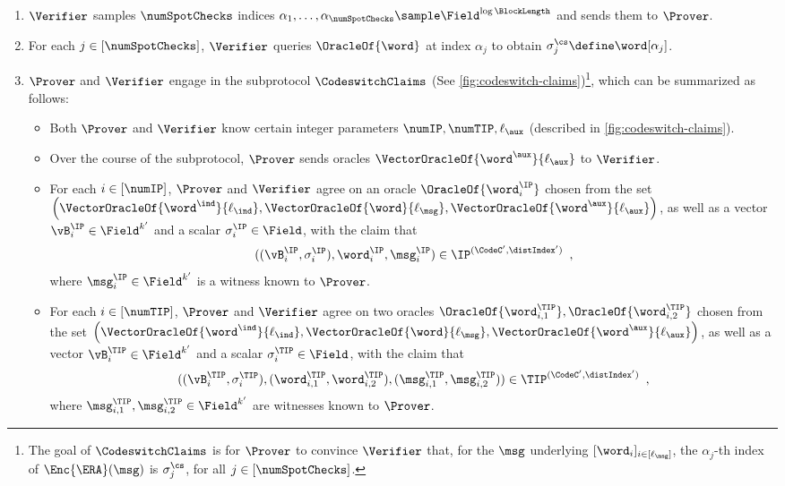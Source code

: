 \begin{tcolorbox}[breakable, enhanced, colback=white, boxrule=0.65pt]
        \begin{enumerate}[nolistsep]
        \item $\Verifier$ samples $\numSpotChecks$  indices $\alpha_1, \dotsc, \alpha_{\numSpotChecks} \sample \Field^{\log \BlockLength}$ and sends them to $\Prover$.
        \item For each $j \in [\numSpotChecks]$, $\Verifier$ queries $\OracleOf{\word}$ at index $\alpha_j$ to obtain $\sigma^{\cs}_j \define \word[\alpha_j]$.
        \item $\Prover$ and $\Verifier$ engage in the subprotocol $\CodeswitchClaims$ (See \cref{fig:codeswitch-claims})\footnote{The goal of $\CodeswitchClaims$ is for $\Prover$ to convince $\Verifier$ that, for the $\msg$ underlying $[\word_i]_{i \in [\ell_{\msg}]}$, the $\alpha_{j}$-th index of $\Enc{\ERA}(\msg)$ is $\sigma^{\cs}_j$, for all $j \in [\numSpotChecks]$.}, which can be summarized as follows:
        \label{item:IOR-codeswitch-claims}
        \begin{itemize}
            \item Both $\Prover$ and $\Verifier$ know certain integer parameters $\numIP, \numTIP, \ell_{\aux}$ (described in \cref{fig:codeswitch-claims}).
            \item Over the course of the subprotocol, $\Prover$ sends oracles $\VectorOracleOf{\word^{\aux}}{\ell_{\aux}}$ to $\Verifier$.
            \item For each $i \in [\numIP]$, $\Prover$ and $\Verifier$ agree on an oracle $\OracleOf{\word^{\IP}_i}$ chosen from the set $\left ( \VectorOracleOf{\word^{\ind}}{\ell_{\ind}}, \VectorOracleOf{\word}{\ell_{\msg}}, \VectorOracleOf{\word^{\aux}}{\ell_{\aux}} \right )$, as well as a vector $\vB^{\IP}_i \in \Field^{k'}$ and a scalar $\sigma^{\IP}_i \in \Field$, with the claim that
            \[
                ((\vB^{\IP}_i, \sigma^{\IP}_i), \word^{\IP}_i, \msg^{\IP}_i) \in \IP^{(\CodeC', \distIndex')} \enspace,
            \]
            where $\msg^{\IP}_i \in \Field^{k'}$ is a witness known to $\Prover$.
            \item For each $i \in [\numTIP]$, $\Prover$ and $\Verifier$ agree on two oracles $\OracleOf{\word^{\TIP}_{i,1}}, \OracleOf{\word^{\TIP}_{i,2}}$ chosen from the set $\left ( \VectorOracleOf{\word^{\ind}}{\ell_{\ind}}, \VectorOracleOf{\word}{\ell_{\msg}}, \VectorOracleOf{\word^{\aux}}{\ell_{\aux}} \right )$, as well as a vector $\vB^{\TIP}_i \in \Field^{k'}$ and a scalar $\sigma^{\TIP}_i \in \Field$, with the claim that
            \[
                ((\vB^{\TIP}_i, \sigma^{\TIP}_i), (\word^{\TIP}_{i,1}, \word^{\TIP}_{i,2}), (\msg^{\TIP}_{i,1}, \msg^{\TIP}_{i,2})) \in \TIP^{(\CodeC', \distIndex')} \enspace,
            \]
            where $\msg^{\TIP}_{i,1}, \msg^{\TIP}_{i,2} \in \Field^{k'}$ are witnesses known to $\Prover$.
        \end{itemize}
        \end{enumerate}


\end{tcolorbox}
